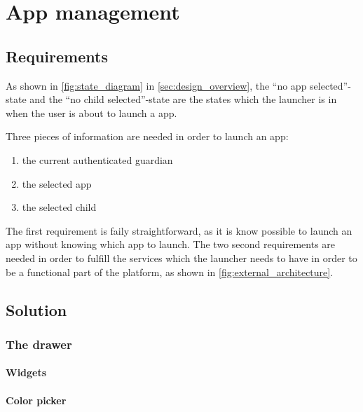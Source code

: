 \section{App management}
\label{sec:app_management}

\subsection{Requirements}
\label{sec:appman_requirements}

As shown in \autoref{fig:state_diagram} in \autoref{sec:design_overview}, the ``no app selected''-state and the ``no child selected''-state are the states which the launcher is in when the user is about to launch a \giraf[] app.

Three pieces of information are needed in order to launch an app:

\begin{enumerate}
	\item the current authenticated guardian
	\item the selected app
	\item the selected child
\end{enumerate}

The first requirement is faily straightforward, as it is know possible to launch an app without knowing which app to launch. The two second requirements are needed in order to fulfill the services which the launcher needs to have in order to be a functional part of the \giraf[] platform, as shown in \autoref{fig:external_architecture}.


\subsection{Solution}
\label{sec:appman_solution}

\subsubsection{The drawer}
\label{sec:drawer}
\paragraph{Widgets}
\label{par:widgets}
\paragraph{Color picker}
\label{par:colorpicker}